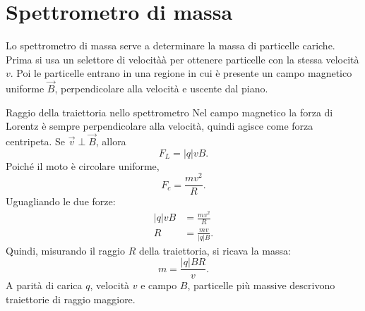 \documentclass[a4paper]{article}
\begin{document}
\section{Spettrometro di massa}

Lo spettrometro di massa serve a determinare la massa di particelle cariche. Prima si usa un selettore di velocitàà per ottenere particelle con la stessa velocità \(v\). Poi le particelle entrano in una regione in cui è presente un campo magnetico uniforme \(\vec{B}\), perpendicolare alla velocità e uscente dal piano.

\begin{center}
\end{center}

\begin{snippetproposition}{Raggio della traiettoria nello spettrometro}
    Nel campo magnetico la forza di Lorentz è sempre perpendicolare alla velocità, quindi agisce come forza centripeta. Se \(\vec{v}\perp\vec{B}\), allora
    \[
        F_L=\left|q\right|vB.
    \]
    Poiché il moto è circolare uniforme,
    \[
        F_c=\frac{mv^2}{R}.
    \]
    Uguagliando le due forze:
    \begin{align*}
        \left|q\right|vB&=\frac{mv^2}{R} \\
        R&=\frac{mv}{\left|q\right|B}.
    \end{align*}
    Quindi, misurando il raggio \(R\) della traiettoria, si ricava la massa:
    \[
        m=\frac{\left|q\right|BR}{v}.
    \]
    A parità di carica \(q\), velocità \(v\) e campo \(B\), particelle più massive descrivono traiettorie di raggio maggiore.
\end{snippetproposition}
\end{document}
